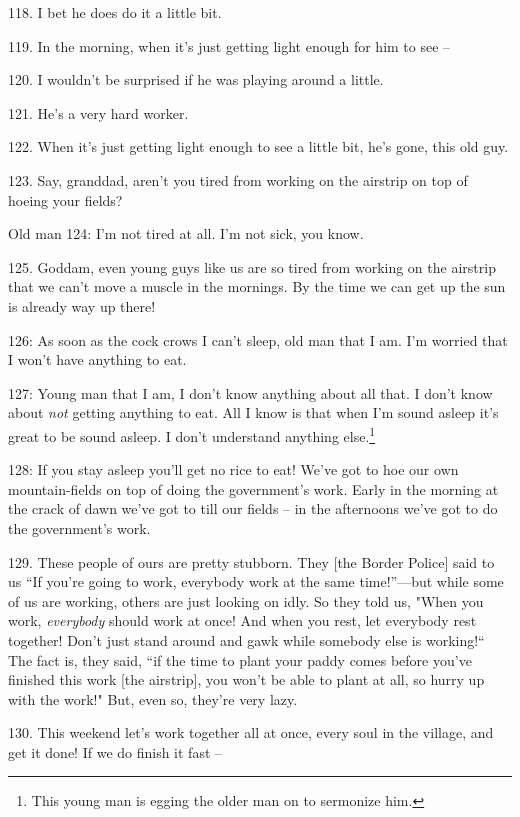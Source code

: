 118. I bet he does do it a little bit.

119. In the morning, when it's just getting light enough for him to see --

120. I wouldn't be surprised if he was playing around a little.


121. He's a very hard worker.

122. When it's just getting light enough to see a little bit, he's gone, this old
guy.

123. Say, granddad, aren't you tired from working on the airstrip on top of hoeing
your fields?

Old man 124: I'm not tired at all. I'm not sick, you know.

125. Goddam, even young guys like us are so tired from working on the airstrip
that we can't move a muscle in the mornings. By the time we can get up the sun
is already way up there!

 126: As soon as the cock crows I can't sleep, old man
that I am. I'm worried that I won't have anything to eat.

 127: Young man that I am, I don't know anything about
all that. I don't know about \textit{not} getting anything to eat. All I know is
that when I'm sound asleep it's great to be sound asleep. I don't understand anything
else.\footnote{This young man is egging the older man on to sermonize him.}

 128: If you stay asleep you'll get no rice to eat!
We've got to hoe our own mountain-fields on top of doing the government's work.
Early in the morning at the crack of dawn we've got to till our fields -- in the
afternoons we've got to do the government's work.

129. These people of ours are pretty stubborn. They [the Border Police] said to
us ``If you're going to work, everybody work at the same time!''---but
while some of us are working, others are just looking on idly. So they told us,
"When you work, \textit{everybody} should work at once! And when you rest,
let everybody rest together! Don't just stand around and gawk while somebody else
is working!`` The fact is, they said, ``if the time to plant your
paddy comes before you've finished this work [the airstrip], you won't be able
to plant at all, so hurry up with the work!" But, even so, they're very
lazy.

130. This weekend let's work together all at once, every soul in the village, and
get it done! If we do finish it fast --

